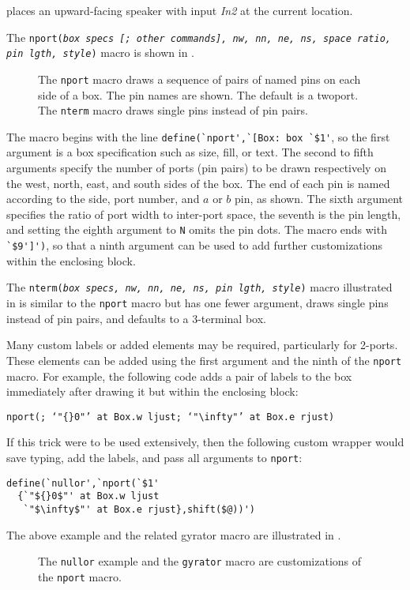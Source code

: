 \noindent
places an upward-facing speaker with input {\sl In2} at the
current location.

\pagebreak
The {\tt nport({\sl box specs {\tt[;} other commands{\tt]},
  nw, nn, ne, ns, space ratio, pin lgth, style})}
macro is shown in .
\begin{figure}[H]
   
   \caption{The {\tt nport} macro draws a sequence of pairs of named pins
     on each side of a box.  The pin names are shown.  The default is a twoport.
     The {\tt nterm} macro draws single pins instead of pin pairs.}
   \label{Nport}
   \end{figure}
The macro begins with the line
 \verb|define(`nport',`[Box: box `$1'|,
so the first argument is a box specification such as size, fill,
or text.
The second to fifth arguments specify the number of ports
(pin pairs) to be drawn respectively on the west, north, east, and south
sides of the box.  The end of each pin is named according to the
side, port number, and $a$ or $b$ pin, as shown.
The sixth argument
specifies the ratio of port width to inter-port space, the seventh is
the pin length, and setting the eighth argument to {\tt N} omits the pin
dots.
The macro ends with \verb|`$9']')|, so that a ninth argument can be used
to add further customizations within the enclosing block.

The {\tt nterm({\sl box specs, nw, nn, ne, ns, pin lgth, style})} macro
illustrated in  is similar to the {\tt nport} macro but
has one fewer argument, draws single pins instead of pin pairs, and
defaults to a 3-terminal box.

Many custom labels or added elements may be required, particularly for
2-ports\label{Nports:}. These elements can be added using the first
argument and the ninth of the {\tt nport} macro.
For example, the following code adds a pair of labels to the box
immediately after drawing it but within the enclosing block:

{\tt nport(; {`"${}0$"'\ at Box.w ljust; `"$\infty$"'\ at
 Box.e rjust})}

If this trick were to be used extensively, then the following custom wrapper
would save typing, add the labels, and pass all arguments to
{\tt nport}:

\begin{verbatim}
define(`nullor',`nport(`$1'
  {`"${}0$"' at Box.w ljust
   `"$\infty$"' at Box.e rjust},shift($@))')
\end{verbatim}

The above example and the related gyrator macro are illustrated in
.
\begin{figure}[H]
   
   \caption{The {\tt nullor} example and the {\tt gyrator}
    macro are customizations of the {\tt nport} macro.}
   \label{NLG}
   \end{figure}

